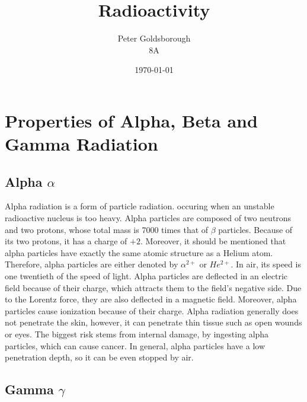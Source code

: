 




\title{\Huge Radioactivity}

\author {
Peter Goldsborough\\
8A
}

\date{\today}

\maketitle

\chapter*{Properties of Alpha, Beta and Gamma Radiation}

\section*{Alpha $\alpha$}

Alpha radiation is a form of particle radiation. occuring when an unstable radioactive nucleus is too heavy. Alpha particles are composed of two neutrons and two protons, whose total mass is 7000 times that of $\beta$ particles. Because of its two protons, it has a charge of $+2$. Moreover, it should be mentioned that alpha particles have exactly the same atomic structure as a Helium atom. Therefore, alpha particles are either denoted by $\alpha^{2+}$ or $He^{2+}$. In air, its speed is one twentieth of the speed of light. Alpha particles are deflected in an electric field because of their charge, which attracts them to the field's negative side. Due to the Lorentz force, they are also deflected in a magnetic field. Moreover, alpha particles cause ionization because of their charge. Alpha radiation generally does not penetrate the skin, however, it can penetrate thin tissue such as open wounds or eyes. The biggest risk stems from internal damage, by ingesting alpha particles, which can cause cancer. In general, alpha particles have a low penetration depth, so it can be even stopped by air.

\section*{Gamma $\gamma$}

